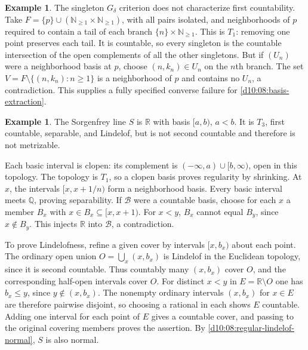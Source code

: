 \documentclass[11pt,oneside,openany]{book}
\theoremstyle{definition}
\newtheorem{example}[theorem]{Example}
\theoremstyle{remark}
\newcommand{\R}{\mathbb R}\newcommand{\C}{\mathbb C}
\newcommand{\N}{\mathbb N}\newcommand{\Z}{\mathbb Z}\newcommand{\Q}{\mathbb Q}
\begin{document}
\begin{example}\label{d10:08:fan}
The singleton $G_\delta$ criterion does not characterize first countability. Take $F=\{p\}\cup(\N_{\geq1}\times\N_{\geq1})$, with all pairs isolated, and neighborhoods of $p$ required to contain a tail of each branch $\{n\}\times\N_{\geq1}$. This is $T_1$: removing one point preserves each tail. It is countable, so every singleton is the countable intersection of the open complements of all the other singletons. But if $(U_n)$ were a neighborhood basis at $p$, choose $(n,k_n)\in U_n$ on the $n$th branch. The set $V=F\setminus\{(n,k_n):n\geq1\}$ is a neighborhood of $p$ and contains no $U_n$, a contradiction. This supplies a fully specified converse failure for \cref{d10:08:basis-extraction}.
\end{example}

\begin{example}\label{d10:08:sorgenfrey-line}
The Sorgenfrey line $S$ is $\R$ with basis $[a,b)$, $a<b$. It is $T_3$, first countable, separable, and Lindelof, but is not second countable and therefore is not metrizable.

Each basic interval is clopen: its complement is $(-\infty,a)\cup[b,\infty)$, open in this topology. The topology is $T_1$, so a clopen basis proves regularity by shrinking. At $x$, the intervals $[x,x+1/n)$ form a neighborhood basis. Every basic interval meets $\Q$, proving separability. If $\mathcal B$ were a countable basis, choose for each $x$ a member $B_x$ with $x\in B_x\subseteq[x,x+1)$. For $x<y$, $B_x$ cannot equal $B_y$, since $x\notin B_y$. This injects $\R$ into $\mathcal B$, a contradiction.

To prove Lindelofness, refine a given cover by intervals $[x,b_x)$ about each point. The ordinary open union $O=\bigcup_x(x,b_x)$ is Lindelof in the Euclidean topology, since it is second countable. Thus countably many $(x,b_x)$ cover $O$, and the corresponding half-open intervals cover $O$. For distinct $x<y$ in $E=\R\setminus O$ one has $b_x\leq y$, since $y\notin(x,b_x)$. The nonempty ordinary intervals $(x,b_x)$ for $x\in E$ are therefore pairwise disjoint, so choosing a rational in each shows $E$ countable. Adding one interval for each point of $E$ gives a countable cover, and passing to the original covering members proves the assertion. By \cref{d10:08:regular-lindelof-normal}, $S$ is also normal.
\end{example}
\end{document}
